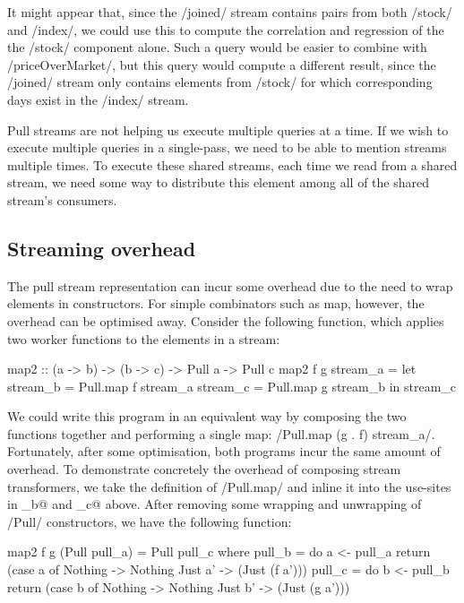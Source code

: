 It might appear that, since the \Hs/joined/ stream contains pairs from both \Hs/stock/ and \Hs/index/, we could use this to compute the correlation and regression of the the \Hs/stock/ component alone.
Such a query would be easier to combine with \Hs/priceOverMarket/, but this query would compute a different result, since the \Hs/joined/ stream only contains elements from \Hs/stock/ for which corresponding days exist in the \Hs/index/ stream.

Pull streams are not helping us execute multiple queries at a time.
If we wish to execute multiple queries in a single-pass, we need to be able to mention streams multiple times.
To execute these shared streams, each time we read from a shared stream, we need some way to distribute this element among all of the shared stream's consumers.

\subsection{Streaming overhead}
\label{taxonomy/pull/streaming-overhead}

The pull stream representation can incur some overhead due to the need to wrap elements in \Hs@Maybe@ constructors.
For simple combinators such as map, however, the overhead can be optimised away.
Consider the following function, which applies two worker functions to the elements in a stream:

\begin{haskell}
map2 :: (a -> b) -> (b -> c) -> Pull a -> Pull c
map2 f g stream_a
 = let stream_b = Pull.map f stream_a
       stream_c = Pull.map g stream_b
   in  stream_c
\end{haskell}

We could write this program in an equivalent way by composing the two functions together and performing a single map: \Hs/Pull.map (g . f) stream_a/.
Fortunately, after some optimisation, both programs incur the same amount of overhead.
To demonstrate concretely the overhead of composing stream transformers, we take the definition of \Hs/Pull.map/ and inline it into the use-sites in \Hs@stream_b@ and \Hs@stream_c@ above.
After removing some wrapping and unwrapping of \Hs/Pull/ constructors, we have the following function:

\begin{haskell}
map2 f g (Pull pull_a) = Pull pull_c
 where
  pull_b = do
    a <- pull_a
    return (case a of
             Nothing -> Nothing
             Just a' -> (Just (f a')))
  pull_c = do
    b <- pull_b
    return (case b of
             Nothing -> Nothing
             Just b' -> (Just (g a')))
\end{haskell}


